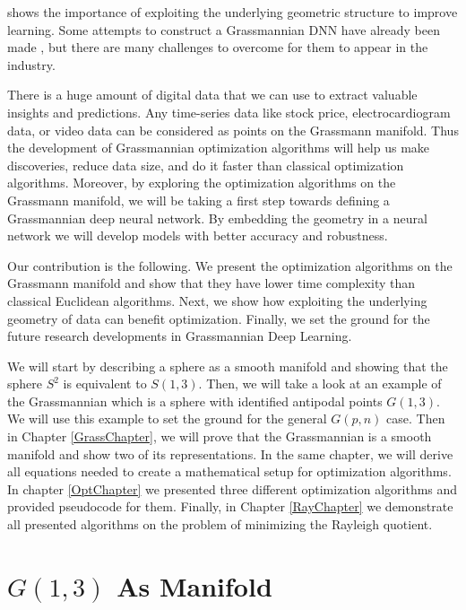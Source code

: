 \documentclass[11pt,a4paper]{report}
\begin{document}
shows the importance of exploiting the underlying geometric structure to improve learning.
Some attempts to construct a Grassmannian DNN have already been made \cite{zhang_grassmannian_2018} \cite{huang_building_2018}, but there are many challenges to overcome for them to appear in the industry.
\par
There is a huge amount of digital data that we can use to extract valuable insights and predictions.
Any time-series data like stock price, electrocardiogram data, or video data can be considered as points on the Grassmann manifold.
Thus the development of Grassmannian optimization algorithms will help us make discoveries, reduce data size, and do it faster than classical optimization algorithms.
Moreover, by exploring the optimization algorithms on the Grassmann manifold, we will be taking a first step towards defining a Grassmannian deep neural network.
By embedding the geometry in a neural network we will develop models with better accuracy and robustness.
\par
Our contribution is the following.
We present the optimization algorithms on the Grassmann manifold and show that they have lower time complexity than classical Euclidean algorithms.
Next, we show how exploiting the underlying geometry of data can benefit optimization.
Finally, we set the ground for the future research developments in Grassmannian Deep Learning.
\par
We will start by describing a sphere as a smooth manifold and showing that the sphere $S^2$ is equivalent to $S(1,3)$.
Then, we will take a look at an example of the Grassmannian which is a sphere with identified antipodal points $G(1,3)$.
We will use this example to set the ground for the general $G(p,n)$ case. Then in Chapter \ref{GrassChapter}, we will prove that the Grassmannian is a smooth manifold and show two of its representations.
In the same chapter, we will derive all equations needed to create a mathematical setup for optimization algorithms.
In chapter \ref{OptChapter} we presented three different optimization algorithms and provided pseudocode for them.
Finally, in Chapter \ref{RayChapter} we demonstrate all presented algorithms on the problem of minimizing the Rayleigh quotient.






\chapter{$G(1,3)$ As Manifold}
      
\end{document}
